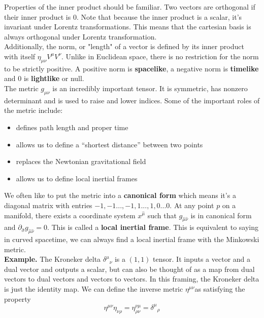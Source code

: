 \documentclass[11pt]{article}
\begin{document}
\noindent Properties of the inner product should be familiar. Two vectors are orthogonal if their inner product is 0. Note that because the inner product is a scalar, it's invariant under Lorentz transformations. This means that the cartesian
basis is always orthogonal under Lorentz transformation. 
\\

\noindent Additionally, the norm, or "length" of a vector is defined by its inner product with itself \( \eta_{\mu \nu}V^{\mu}V^{\nu} \). Unlike in Euclidean space, there is no restriction for the norm to be strictly positive. A positive
norm is \textbf{spacelike}, a negative norm is \textbf{timelike} and 0 is \textbf{lightlike} or null. 
\\

\noindent The metric \(g_{\mu \nu}\) is an incredibly important tensor. It is symmetric, has nonzero determinant and is used to raise and lower indices. Some of the important roles of the metric include:
    \begin{itemize}
        \item[-] defines path length and proper time
        \item[-] allows us to define a ``shortest distance'' between two points
        \item[-] replaces the Newtonian gravitational field
        \item[-] allows us to define local inertial frames 
    \end{itemize}
    

\noindent We often like to put the metric into a \textbf{canonical form} which means it's a diagonal matrix with entries \(-1,-1 ..., -1, 1..., 1,0 ...0\).
At any point \(p\) on a manifold, there exists a coordinate system \(x^{\hat{\mu}}\) such that \(g_{\hat{\mu}\hat{\nu}}\) is in canonical form and \(\partial_{\hat{\sigma}} g_{\hat{\mu}\hat{\nu}} = 0\). This is called a \textbf{local inertial frame}. This is equivalent to saying
in curved spacetime, we can always find a local inertial frame with the Minkowski metric.
\\


\noindent \textbf{Example.} The Kroneker delta \( \delta^{\mu}{}_\nu \) is a \( (1,1) \) tensor. It inputs a vector and a dual vector and outputs a scalar, but can also be thought of as a map from dual vectors to dual vectors and vectors to vectors.
In this framing, the Kroneker delta is just the identity map. We can define the inverse metric \( \eta^{\mu \nu} \)as satisfying the property
\[ 
    \eta^{\mu \nu} \eta_{{\nu \rho}} = \eta_{\rho \nu}^{\nu \mu} = \delta^{\mu}{}_{\rho}
\]
\end{document}
